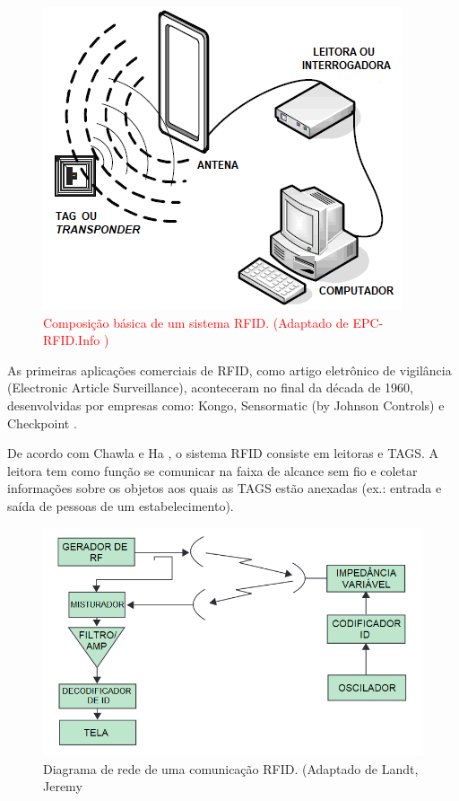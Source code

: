\begin{figure}[H]
    \centering
    \includegraphics[width=0.6\linewidth]{figs/Fundamentos/Composicao.png}
    \caption{\textcolor{red}{Composição básica de um sistema RFID. (Adaptado de EPC-RFID.Info \cite{EPC-RFID-link})}}
    \label{fig:ComposicaoRFID}
\end{figure}


As primeiras aplicações comerciais de RFID, como artigo eletrônico de vigilância (Electronic Article Surveillance), aconteceram no final da década de 1960, desenvolvidas por empresas como: Kongo, Sensormatic (by Johnson Controls) e Checkpoint \cite{chawla2007overview}.

De acordo com Chawla e Ha \cite{chawla2007overview}, o sistema RFID consiste em leitoras e TAGS. A leitora tem como função se comunicar na faixa de alcance sem fio e coletar informações sobre os objetos aos quais as TAGS estão anexadas (ex.: entrada e saída de pessoas de um estabelecimento).

\begin{figure}[H]
    \centering
    \includegraphics[width=0.6\linewidth]{figs/Fundamentos/RFIDdiagram.png}
    \caption{Diagrama de rede de uma comunicação RFID. (Adaptado de Landt, Jeremy \cite{landt2005history}}
    \label{fig:DiagramaRFID}
\end{figure}

